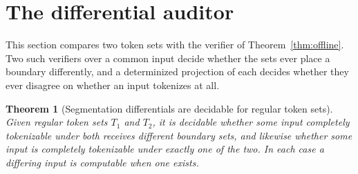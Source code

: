 \documentclass[11pt,a4paper]{article}
\theoremstyle{definition}
\theoremstyle{plain}
\newtheorem{theorem}{Theorem}
\begin{document}

\section{The differential auditor}\label{sec:diff}

This section compares two token sets with the verifier of Theorem~\ref{thm:offline}. Two such verifiers over a common
input decide whether the sets ever place a boundary differently, and a determinized projection of each decides whether
they ever disagree on whether an input tokenizes at all.
\begin{theorem}[Segmentation differentials are decidable for regular token sets]\label{thm:diff}
Given regular token sets $T_1$ and $T_2$, it is decidable whether some input completely tokenizable under both receives
different boundary sets, and likewise whether some input is completely tokenizable under exactly one of the two. In each
case a differing input is computable when one exists.
\end{theorem}
\end{document}
